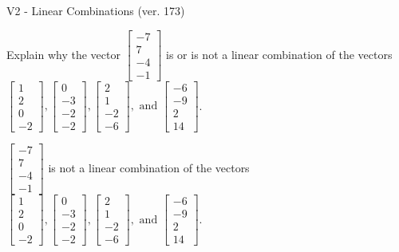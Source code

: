 \begin{exercise}
  \begin{exerciseTitle}V2 - Linear Combinations (ver. 173)\end{exerciseTitle}
  \begin{exerciseStatement}
    Explain why the vector \(\left[\begin{array}{c}
-7 \\
7 \\
-4 \\
-1
\end{array}\right]\)  is or is not a linear 
	combination of the vectors \(\left[\begin{array}{c}
1 \\
2 \\
0 \\
-2
\end{array}\right] , \left[\begin{array}{c}
0 \\
-3 \\
-2 \\
-2
\end{array}\right] , \left[\begin{array}{c}
2 \\
1 \\
-2 \\
-6
\end{array}\right] , \text{ and } \left[\begin{array}{c}
-6 \\
-9 \\
2 \\
14
\end{array}\right]\).
	


  \end{exerciseStatement}
  \begin{exerciseAnswer}
   \(\left[\begin{array}{c}
-7 \\
7 \\
-4 \\
-1
\end{array}\right]\) 
  	 is not  
	a linear combination of the vectors \(\left[\begin{array}{c}
1 \\
2 \\
0 \\
-2
\end{array}\right] , \left[\begin{array}{c}
0 \\
-3 \\
-2 \\
-2
\end{array}\right] , \left[\begin{array}{c}
2 \\
1 \\
-2 \\
-6
\end{array}\right] , \text{ and } \left[\begin{array}{c}
-6 \\
-9 \\
2 \\
14
\end{array}\right]\).


\end{exerciseAnswer}
\end{exercise}
